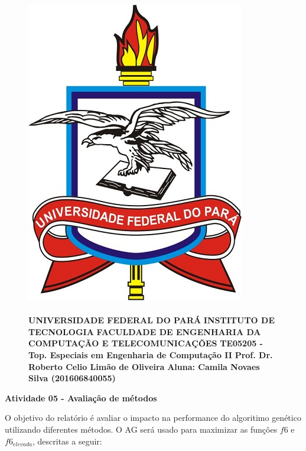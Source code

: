 \documentclass[12pt]{article}
\title{}
\date{}
\begin{document}
\begin{figure}
		\begin{minipage}{.3\linewidth}
			\centering
			\includegraphics[width=.6\linewidth]{imgs/ufpa.jpg}
		\end{minipage}
		\begin{minipage}{.70\linewidth}
			\flushleft
			\paragraph{}
			\textbf{ }\newline
			\textbf{UNIVERSIDADE FEDERAL DO PARÁ} \newline
			\textbf{INSTITUTO DE TECNOLOGIA} \newline
			\textbf{FACULDADE DE ENGENHARIA DA COMPUTAÇÃO E TELECOMUNICAÇÕES} \newline
			\textbf{TE05205 - Top. Especiais em Engenharia de Computação II} \newline
            \textbf{Prof. Dr. Roberto Celio Limão de Oliveira} \newline
            \textbf{Aluna: Camila Novaes Silva (201606840055)}
		\end{minipage}
\end{figure}
\FloatBarrier
\begin{center}
    {\Large \textbf{Atividade 05 - Avaliação de métodos}}
\end{center}
\hfill

O objetivo do relatório é avaliar o impacto na performance do algoritimo genético utilizando
diferentes métodos. O AG será usado para maximizar as funções $f6$ e $f6_{elevada}$, descritas a seguir:
\end{document}
